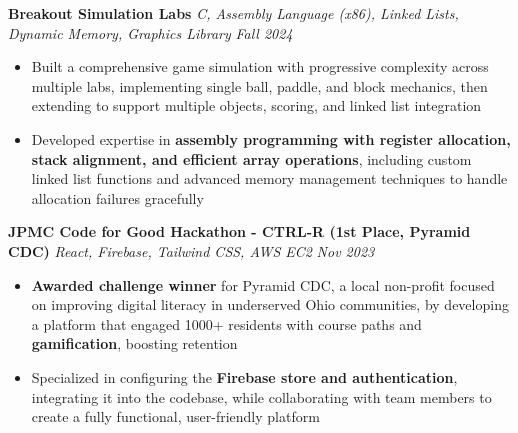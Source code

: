 \documentclass[letterpaper]{article}
\newenvironment{tightitemize}{%
  \begin{itemize}\small\setlength{\baselineskip}{0.95\baselineskip}\itemsep -1mm%
}{\end{itemize}}
\begin{document}
    {\textbf{Breakout Simulation Labs}} {\sl C, Assembly Language (x86), Linked Lists, Dynamic Memory, Graphics Library} \hfill \textsl{Fall 2024}\\
    \vspace{-2mm}
    \begin{tightitemize} \itemsep -1mm
    
        \item Built a comprehensive game simulation with progressive complexity across multiple labs, implementing single ball, paddle, and block mechanics, then extending to support multiple objects, scoring, and linked list integration

        \item Developed expertise in \textbf{assembly programming with register allocation, stack alignment, and efficient array operations}, including custom linked list functions and advanced memory management techniques to handle allocation failures gracefully

    \end{tightitemize}
    \vspace{-2mm}

    {\textbf{JPMC Code for Good Hackathon - CTRL-R (1st Place, Pyramid CDC)}} {\sl React, Firebase, Tailwind CSS, AWS EC2} \hfill \textsl{Nov 2023}\\
    \vspace{-2mm}
    \begin{tightitemize} \itemsep -1mm
    
        \item \textbf{Awarded challenge winner} for Pyramid CDC, a local non-profit focused on improving digital literacy in underserved Ohio communities, by developing a platform that engaged 1000+ residents with course paths and \textbf{gamification}, boosting retention

        \item Specialized in configuring the \textbf{Firebase store and authentication}, integrating it into the codebase, while collaborating with team members to create a fully functional, user-friendly platform

    \end{tightitemize}
    \vspace{-2mm}
\end{document}
